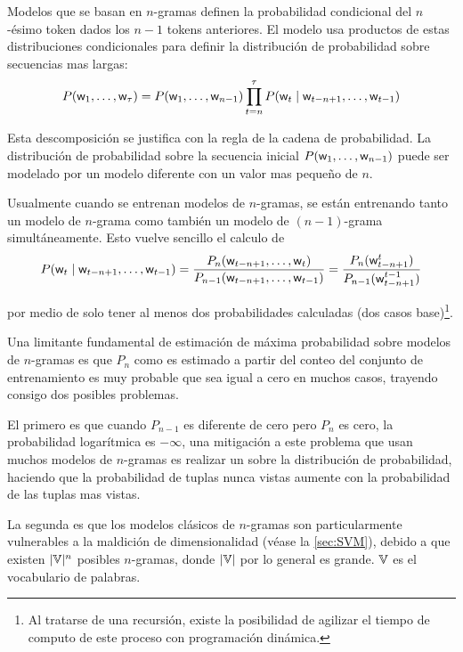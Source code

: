 Modelos que se basan en $n$-gramas definen la probabilidad condicional del $n$-ésimo token dados los $n-1$ tokens anteriores. El modelo usa productos de estas distribuciones condicionales para definir la distribución de probabilidad sobre secuencias mas largas:
\begin{equation}
  P({\mathit{\mathsf{w}}}_1, \ldots, {\mathit{\mathsf{w}}}_\tau) = P({\mathit{\mathsf{w}}}_1, \ldots, {\mathit{\mathsf{w}}}_{n-1}) \prod_{t = n}^{\tau} P({\mathit{\mathsf{w}}}_t \mid {\mathit{\mathsf{w}}}_{t-n+1}, \ldots, {\mathit{\mathsf{w}}}_{t-1})
\end{equation}

Esta descomposición se justifica con la regla de la cadena de probabilidad. La distribución de probabilidad sobre la secuencia inicial $P({\mathit{\mathsf{w}}}_1, \ldots, {\mathit{\mathsf{w}}}_{n-1})$ puede ser modelado por un modelo diferente con un valor mas pequeño de $n$.

Usualmente cuando se entrenan modelos de $n$-gramas, se están entrenando tanto un modelo de $n$-grama como también un modelo de $(n-1)$-grama simultáneamente. Esto vuelve sencillo el calculo de
\begin{equation}
  P({\mathit{\mathsf{w}}}_t \mid {\mathit{\mathsf{w}}}_{t-n+1}, \ldots, {\mathit{\mathsf{w}}}_{t-1}) = \frac{P_n({\mathit{\mathsf{w}}}_{t-n+1}, \ldots, {\mathit{\mathsf{w}}}_t)}{P_{n-1}({\mathit{\mathsf{w}}}_{t-n+1}, \ldots, {\mathit{\mathsf{w}}}_{t-1})} = \frac{P_n({\mathit{\mathsf{w}}}_{t-n+1}^{t})}{P_{n-1}({\mathit{\mathsf{w}}}_{t-n+1}^{t-1})}
\end{equation}

por medio de solo tener al menos dos probabilidades calculadas (dos casos base)\footnote{Al tratarse de una recursión, existe la posibilidad de agilizar el tiempo de computo de este proceso con programación dinámica.}.

Una limitante fundamental de estimación de máxima probabilidad sobre modelos de $n$-gramas es que $P_n$ como es estimado a partir del conteo del conjunto de entrenamiento es muy probable que sea igual a cero en muchos casos, trayendo consigo dos posibles problemas.

El primero es que cuando $P_{n-1}$ es diferente de cero pero $P_n$ es cero, la probabilidad logarítmica es $-\infty$, una mitigación a este problema que usan muchos modelos de $n$-gramas es realizar un  sobre la distribución de probabilidad, haciendo que la probabilidad de tuplas nunca vistas aumente con la probabilidad de las tuplas mas vistas.

La segunda es que los modelos clásicos de $n$-gramas son particularmente vulnerables a la maldición de dimensionalidad (véase la \cref{sec:SVM}), debido a que existen $|{\mathbb{V}}|^n$ posibles $n$-gramas, donde $|{\mathbb{V}}|$ por lo general es grande. ${\mathbb{V}}$ es el vocabulario de palabras.

